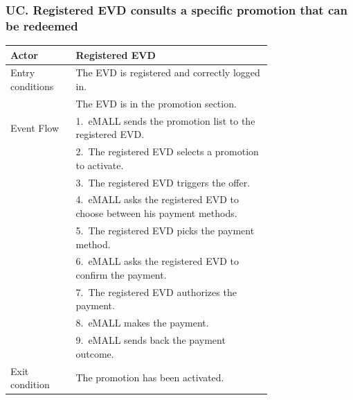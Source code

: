 \subsubsection*{UC\cuc . Registered EVD consults a specific promotion that can be redeemed}
\begin{center}
    \begin{longtable}{lp{0.75\linewidth}}
        \hline
        Actor            & Registered EVD                                                                                                        \\
        \hline
        Entry conditions & The EVD is registered and correctly logged in.                                                                        \\
        & The EVD is in the promotion section.                                                                                  \\
        \hline
        Event Flow       & 1.\ eMALL sends the promotion list to the registered EVD.                                                             \\
        & 2.\ The registered EVD selects a promotion to activate.                                                               \\
        & 3.\ The registered EVD triggers the offer.                                                                            \\
        & 4.\ eMALL asks the registered EVD to choose between his payment methods.                                              \\
        & 5.\ The registered EVD picks the payment method.                                                                      \\
        & 6.\ eMALL asks the registered EVD to confirm the payment.                                                             \\
        & 7.\ The registered EVD authorizes the payment.                                                                        \\
        & 8.\ eMALL makes the payment.                                                                                          \\
        & 9.\ eMALL sends back the payment outcome.                                                                             \\
        \hline
        Exit condition   & The promotion has been activated.                                                                                     \\

\end{longtable}
\end{center}
